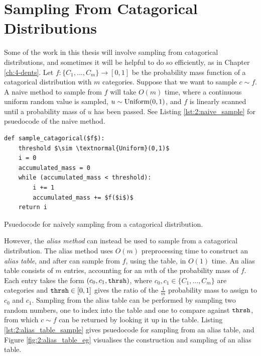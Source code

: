\section{Sampling From Catagorical Distributions}
\label{sec:2-6-sampling}
    

    Some of the work in this thesis will involve sampling from catagorical distributions, and sometimes it will be helpful to do so efficiently, as in Chapter \ref{ch:4-dents}. Let $f:\{C_1,...,C_m\}\rightarrow[0,1]$ be the probability mass function of a catagorical distribution with $m$ categories. Suppose that we want to sample $c\sim f$. A naive method to sample from $f$ will take $O(m)$ time, where a continuous uniform random value is sampled, $u\sim\textnormal{Uniform}(0,1)$, and $f$ is linearly scanned until a probability mass of $u$ has been passed. See Listing \ref{lst:2:naive_sample} for psuedocode of the naive method.

    \begin{Listing}
        \begin{lstlisting}
def sample_catagorical($f$):
    threshold $\sim \textnormal{Uniform}(0,1)$
    i = 0
    accumulated_mass = 0
    while (accumulated_mass < threshold):
        i += 1
        accumulated_mass += $f($i$)$
    return i
        \end{lstlisting}
        \caption{Psuedocode for naively sampling from a catagorical distribution.}
        \label{lst:2:naive_sample}
    \end{Listing}

    However, the \textit{alias method} \cite{alias_method_one,alias_method_two} can instead be used to sample from a catagorical distribution. The alias method uses $O(m)$ preprocessing time to construct an \textit{alias table}, and after can sample from $f$, using the table, in $O(1)$ time. An alias table consists of $m$ entries, accounting for an $m$th of the probability mass of $f$. Each entry takes the form $(c_0,c_1,{\texttt{thrsh}})$, where $c_0,c_1\in\{C_1,...,C_m\}$ are categories and ${\texttt{thrsh}}\in[0,1]$ gives the ratio of the $\frac{1}{m}$ probability mass to assign to $c_0$ and $c_1$. Sampling from the alias table can be performed by sampling two random numbers, one to index into the table and one to compare against ${\texttt{thrsh}}$, from which $c\sim f$ can be returned by looking it up in the table. Listing \ref{lst:2:alias_table_sample} gives psuedocode for sampling from an alias table, and Figure \ref{fig:2:alias_table_eg} visualises the construction and sampling of an alias table.

